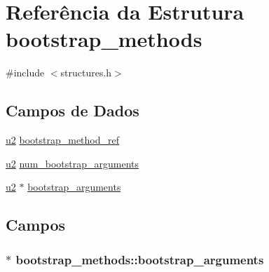 \hypertarget{structbootstrap__methods}{}\section{Referência da Estrutura bootstrap\+\_\+methods}
\label{structbootstrap__methods}


{\ttfamily \#include $<$structures.\+h$>$}

\subsection*{Campos de Dados}
\begin{DoxyCompactItemize}
\item 
\hyperlink{lista__operandos_8h_a732cde1300aafb73b0ea6c2558a7a54f}{u2} \hyperlink{structbootstrap__methods_a480411f5ca41d770aa9ce24ee7e8e1e8}{bootstrap\+\_\+method\+\_\+ref}
\item 
\hyperlink{lista__operandos_8h_a732cde1300aafb73b0ea6c2558a7a54f}{u2} \hyperlink{structbootstrap__methods_aad28739e25a094400551fd1080fdb1f6}{num\+\_\+bootstrap\+\_\+arguments}
\item 
\hyperlink{lista__operandos_8h_a732cde1300aafb73b0ea6c2558a7a54f}{u2} $\ast$ \hyperlink{structbootstrap__methods_a2204bb6639e44938bda3b11fbb32dd10}{bootstrap\+\_\+arguments}
\end{DoxyCompactItemize}


\subsection{Campos}
\subsubsection[{\texorpdfstring{bootstrap\+\_\+arguments}{bootstrap_arguments}}]{$\ast$ bootstrap\+\_\+methods\+::bootstrap\+\_\+arguments}\hypertarget{structbootstrap__methods_a2204bb6639e44938bda3b11fbb32dd10}{}\label{structbootstrap__methods_a2204bb6639e44938bda3b11fbb32dd10}
